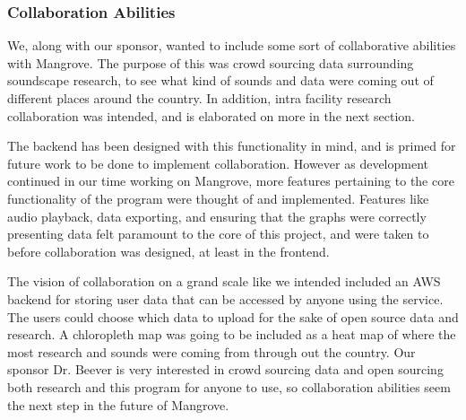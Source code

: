 \subsubsection{Collaboration Abilities}
We, along with our sponsor, wanted to include some sort of collaborative abilities with Mangrove. The purpose of this was crowd sourcing data surrounding soundscape research, to see what kind of sounds and data were coming out of different places around the country. In addition, intra facility research collaboration was intended, and is elaborated on more in the next section.\par
The backend has been designed with this functionality in mind, and is primed for future work to be done to implement collaboration. However as development continued in our time working on Mangrove, more features pertaining to the core functionality of the program were thought of and implemented. Features like audio playback, data exporting, and ensuring that the graphs were correctly presenting data felt paramount to the core of this project, and were taken to before collaboration was designed, at least in the frontend.\par
The vision of collaboration on a grand scale like we intended included an AWS backend for storing user data that can be accessed by anyone using the service. The users could choose which data to upload for the sake of open source data and research. A chloropleth map was going to be included as a heat map of where the most research and sounds were coming from through out the country. Our sponsor Dr. Beever is very interested in crowd sourcing data and open sourcing both research and this program for anyone to use, so collaboration abilities seem the next step in the future of Mangrove.\\


